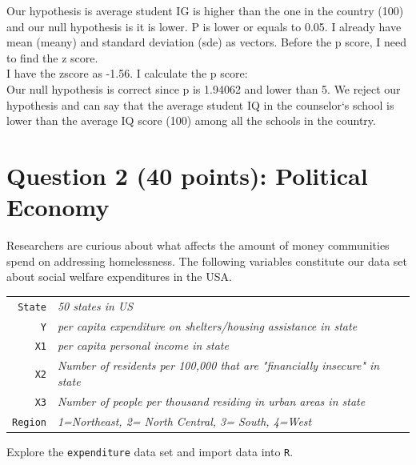 \documentclass[12pt,letterpaper]{article}
\begin{document}
\begin{enumerate}
	\noindent Our hypothesis is average student IG is higher than the one in the country (100) and our null hypothesis is it is lower. P is lower or equals to 0.05. I already have mean (meany) and standard deviation (sde) as vectors. Before the p score, I need to find the z score. \\


	
	\noindent I have the zscore as -1.56. I calculate the p score: \\
	
	\noindent Our null hypothesis is correct since p is 1.94062 and lower than 5. We reject our hypothesis and can say that the average student IQ in the counselor`s school is lower than the average IQ score (100) among all the schools in the country.\\

\newpage

	\section*{Question 2 (40 points): Political Economy}

\noindent Researchers are curious about what affects the amount of money communities spend on addressing homelessness. The following variables constitute our data set about social welfare expenditures in the USA. \\
\vspace{.5cm}


\begin{tabular}{r|l}
	\texttt{State} &\emph{50 states in US} \\
	\texttt{Y} & \emph{per capita expenditure on shelters/housing assistance in state}\\
	\texttt{X1} &\emph{per capita personal income in state} \\
	\texttt{X2} &  \emph{Number of residents per 100,000 that are "financially insecure" in state}\\
	\texttt{X3} &  \emph{Number of people per thousand residing in urban areas in state} \\
	\texttt{Region} &  \emph{1=Northeast, 2= North Central, 3= South, 4=West} \\
\end{tabular}

\vspace{.5cm}
\noindent Explore the \texttt{expenditure} data set and import data into \texttt{R}.
\vspace{.5cm}
\begin{itemize}


\end{itemize}
\end{enumerate}
\end{document}
